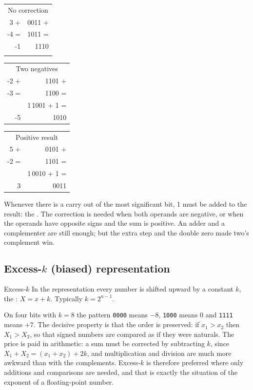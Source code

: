 \begin{center}\ttfamily
\begin{tabular}{@{}r@{\quad}r@{}}
\multicolumn{2}{c}{\textsf{\small No correction}}\\
3 + & 0011 +\\ -4 = & 1011 =\\\hline -1 & 1110\\ &
\end{tabular}\qquad\qquad
\begin{tabular}{@{}r@{\quad}r@{}}
\multicolumn{2}{c}{\textsf{\small Two negatives}}\\
-2 + & 1101 +\\ -3 = & 1100 =\\\hline & \textcolor{prgred}{1}\,1001 + 1 =\\ -5 & 1010
\end{tabular}\qquad\qquad
\begin{tabular}{@{}r@{\quad}r@{}}
\multicolumn{2}{c}{\textsf{\small Positive result}}\\
5 + & 0101 +\\ -2 = & 1101 =\\\hline & \textcolor{prgred}{1}\,0010 + 1 =\\ 3 & 0011
\end{tabular}
\end{center}

Whenever there is a carry out of the most significant bit, 1 must be added to
the result: the . The correction is needed when both
operands are negative, or when the operands have opposite signs and the sum is
positive. An adder and a complementer are still enough; but the extra step
and the double zero made two's complement win.

\subsection{Excess-$k$ (biased) representation}

\begin{definition}{Excess-$k$}
In the  representation every number is shifted upward by a
constant $k$, the : $X = x+k$. Typically $k=2^{n-1}$.
\end{definition}

On four bits with $k=8$ the pattern \texttt{0000} means $-8$, \texttt{1000}
means 0 and \texttt{1111} means $+7$. The decisive property is that the order
is preserved: if $x_1>x_2$ then $X_1>X_2$, so that signed numbers are compared
as if they were naturals. The price is paid in arithmetic: a sum must be
corrected by subtracting $k$, since $X_1+X_2 = (x_1+x_2)+2k$, and
multiplication and division are much more awkward than with the complements.
Excess-$k$ is therefore preferred where only additions and comparisons are
needed, and that is exactly the situation of the exponent of a floating-point
number.


